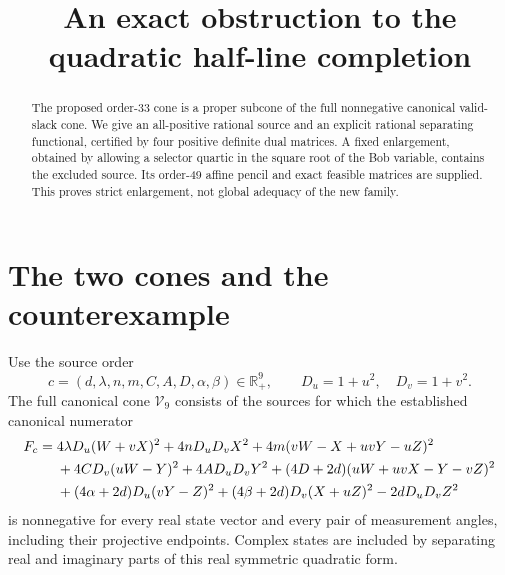 \documentclass[10pt]{article}
\title{An exact obstruction to the quadratic half-line completion}
\author{}
\date{}
\newcommand{\R}{\mathbb R}
\newcommand{\V}{\mathcal V_9}
\begin{document}
\maketitle
\vspace{-2.5em}
\begin{abstract}
The proposed order-33 cone is a proper subcone of the full nonnegative
canonical valid-slack cone. We give an all-positive rational source and an
explicit rational separating functional, certified by four positive definite
dual matrices. A fixed enlargement, obtained by allowing a selector quartic
in the square root of the Bob variable, contains the excluded source. Its
order-49 affine pencil and exact feasible matrices are supplied. This proves
strict enlargement, not global adequacy of the new family.
\end{abstract}

\section{The two cones and the counterexample}
Use the source order
\[
c=(d,\lambda,n,m,C,A,D,\alpha,\beta)\in\R_+^9,
\qquad D_u=1+u^2,\quad D_v=1+v^2.
\]
The full canonical cone $\V$ consists of the sources for which the established
canonical numerator
\begin{align}
F_c={}&4\lambda D_u(W+vX)^2+4nD_uD_vX^2
 +4m(vW-X+uvY-uZ)^2\notag\\
&+4CD_v(uW-Y)^2+4AD_uD_vY^2
 +(4D+2d)(uW+uvX-Y-vZ)^2\notag\\
&+(4\alpha+2d)D_u(vY-Z)^2
 +(4\beta+2d)D_v(X+uZ)^2-2dD_uD_vZ^2                       \label{eq:F}
\end{align}
is nonnegative for every real state vector and every pair of measurement
angles, including their projective endpoints. Complex states are included
by separating real and imaginary parts of this real symmetric quadratic form.
\end{document}
